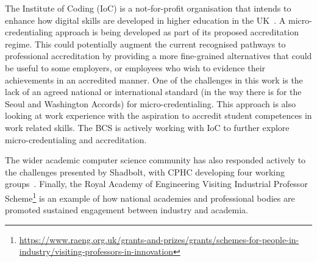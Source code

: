 \documentclass[sigconf]{acmart}
\begin{document}



The Institute of Coding (IoC) is a not-for-profit organisation that
intends to enhance how digital skills are developed in higher
education in the UK~\cite{Davenportetal2019a}. A micro-credentialing
approach is being developed as part of its proposed accreditation
regime. This could potentially augment the current recognised pathways
to professional accreditation by providing a more fine-grained
alternatives that could be useful to some employers, or employees who
wish to evidence their achievements in an accredited manner.  One of
the challenges in this work is the lack of an agreed national or
international standard (in the way there is for the Seoul and
Washington Accords) for micro-credentialing. This approach is also
looking at work experience with the aspiration to accredit student
competences in work related skills. The BCS is actively working with
IoC to further explore micro-credentialing and accreditation.

The wider academic computer science community has also responded
actively to the challenges presented by Shadbolt, with CPHC developing
four working groups~\cite{cphc_2016}.  Finally, the Royal Academy of
Engineering Visiting Industrial Professor
Scheme\footnote{\url{https://www.raeng.org.uk/grants-and-prizes/grants/schemes-for-people-in-industry/visiting-professors-in-innovation}}
is an example of how national academies and professional bodies are
promoted sustained engagement between industry and academia.
\end{document}
